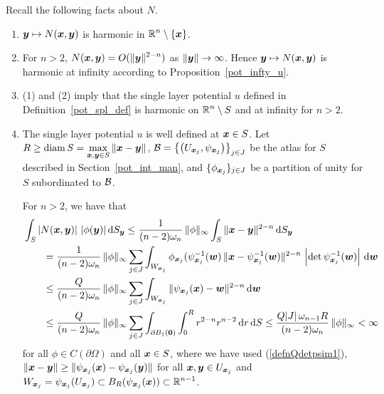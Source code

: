 Recall the following facts about $N$.
\begin{enumerate}
\item ${\bm{y}}\mapsto N({\bm{x}},{\bm{y}})$ is harmonic in
$\displaystyle \mathbb{R}^n \setminus \{ {\bm{x}} \}$.
\item For $n>2$,
$\displaystyle N({\bm{x}},{\bm{y}}) = O(\|{\bm{y}}\|^{2-n})$ as
$\|{\bm{y}}\|\rightarrow \infty$.  Hence ${\bm{y}} \mapsto N({\bm{x}},{\bm{y}})$
is harmonic at infinity according to Proposition~\ref{pot_infty_u}.
\item (1) and (2) imply that the
single layer potential $u$ defined in Definition~\ref{pot_spl_def} is
harmonic on $\displaystyle \mathbb{R}^n \setminus S$ and at infinity for $n>2$. 
\item The single layer potential $u$ is well defined at ${\bm{x}} \in S$.
Let $\displaystyle R \geq \operatorname{diam} S
= \max_{{\bm{x}},{\bm{y}} \in S} \|{\bm{x}}-{\bm{y}}\|$,
$\displaystyle \mathcal{B} = \left\{ \left(U_{{\bm{x}}_j},
\psi_{{\bm{x}}_j}\right) \right \}_{j\in J}$ be the atlas for
$S$ described in Section~\ref{pot_int_man}, and
$\displaystyle \{ \phi_{{\bm{x}}_j} \}_{j\in J}$ be a partition of unity 
for $S$ subordinated to $\mathcal{B}$.

For $n>2$, we have that  
\begin{align*}
&\int_S \left| N({\bm{x}},{\bm{y}}) \right|\, |\phi({\bm{y}})| \,\mathrm{d}{S}_{{\bm{y}}}
\leq \frac{1}{(n-2)\omega_n} \, \|\phi\|_\infty
\int_S \|{\bm{x}}-{\bm{y}}\|^{2-n} \,\mathrm{d}{S}_{{\bm{y}}} \\
&\qquad = \frac{1}{(n-2)\omega_n} \, \|\phi\|_\infty
\sum_{j\in J} \int_{W_{{\bm{x}}_j}}
\phi_{{\bm{x}}_j}(\psi_{{\bm{x}}_j}^{-1}({\bm{w}})\,
\|{\bm{x}}-\psi_{{\bm{x}}_j}^{-1}({\bm{w}})\|^{2-n}
\,\left|\det\psi_{{\bm{x}}_j}^{-1}({\bm{w}})\right| \,\mathrm{d}{{\bm{w}}} \\
&\qquad \leq \frac{Q}{(n-2)\omega_n} \, \|\phi\|_\infty
\sum_{j\in J} \int_{W_{{\bm{x}}_j} }
\|\psi_{{\bm{x}}_j}({\bm{x}})-{\bm{w}}\|^{2-n}\,\mathrm{d}{{\bm{w}}} \\
&\qquad \leq \frac{Q}{(n-2)\omega_n} \, \|\phi\|_\infty
\sum_{j\in J} \int_{\partial B_1({\bm{0}})} \int_0^R
  r^{2-n} r^{n-2} \,\mathrm{d}{r} \,\mathrm{d}{S}
\leq \frac{Q |J|\, \omega_{n-1} R}{(n-2)\omega_n} \, \|\phi\|_\infty
< \infty
\end{align*}
for all $\phi\in C(\partial \Omega)$ and all ${\bm{x}} \in S$, where we
have used (\ref{defnQdetpsim1}), $\displaystyle \|{\bm{x}}-{\bm{y}}\| 
\geq \|\psi_{{\bm{x}}_j}({\bm{x}}) - \psi_{{\bm{x}}_j}({\bm{y}})\|$ for all
$\displaystyle {\bm{x}},{\bm{y}} \in U_{{\bm{x}}_j}$ and
$\displaystyle W_{{\bm{x}}_j} = \psi_{{\bm{x}}_j}(U_{{\bm{x}}_j}) \subset
B_R(\psi_{{\bm{x}}_j}({\bm{x}})) \subset \mathbb{R}^{n-1}$.


\end{enumerate}
